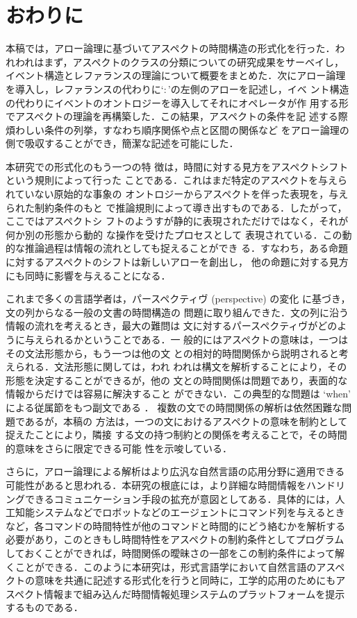 \section{おわりに}\label{sec:discus}
本稿では，アロー論理に基づいてアスペクトの時間構造の形式化を行った．わ
れわれはまず，アスペクトのクラスの分類についての研究成果をサーベイし，
イベント構造とレファランスの理論について概要をまとめた．次にアロー論理
を導入し，レファランスの代わりに`$\colon$'の左側のアローを記述し，イベ
ント構造の代わりにイベントのオントロジーを導入してそれにオペレータが作
用する形でアスペクトの理論を再構築した．この結果，アスペクトの条件を記
述する際煩わしい条件の列挙，すなわち順序関係や点と区間の関係など
をアロー論理の側で吸収することができ，簡潔な記述を可能にした．

本研究での形式化のもう一つの特
徴は，時間に対する見方をアスペクトシフトという規則によって行った
ことである．これはまだ特定のアスペクトを与えられていない原始的な事象の
オントロジーからアスペクトを伴った表現を，与えられた制約条件のもと
で推論規則によって導き出すものである．したがって，ここではアスペクトシ
フトのようすが静的に表現されただけではなく，それが何か別の形態から動的
な操作を受けたプロセスとして
表現されている．この動的な推論過程は情報の流れとしても捉えることができ
る．すなわち，ある命題に対するアスペクトのシフトは新しいアローを創出し，
他の命題に対する見方にも同時に影響を与えることになる．

これまで多くの言語学者は，パースペクティヴ (perspective) の変化 
\cite{Kamp93,Meulen95} に基づき，文の列からなる一般の文書の時間構造の
問題に取り組んできた．文の列に沿う情報の流れを考えるとき，最大の難問は
文に対するパースペクティヴがどのように与えられるかということである．一
般的にはアスペクトの意味は，一つはその文法形態から，もう一つは他の文
との相対的時間関係から説明されると考えられる．文法形態に関しては，われ
われは構文を解析することにより，その形態を決定することができるが，他の
文との時間関係は問題であり，表面的な情報からだけでは容易に解決すること
ができない．この典型的な問題は `when' による従属節をもつ副文である 
\cite{Moens88,Terenziani93}．
複数の文での時間関係の解析は依然困難な問題であるが，本稿の
方法は，一つの文におけるアスペクトの意味を制約として捉えたことにより，隣接
する文の持つ制約との関係を考えることで，その時間的意味をさらに限定できる可能
性を示唆している．

さらに，アロー論理による解析はより広汎な自然言語の応用分野に適用できる
可能性があると思われる．本研究の根底には，より詳細な時間情報をハンドリ
ングできるコミュニケーション手段の拡充が意図としてある．具体的には，人
工知能システムなどでロボットなどのエージェントにコマンド列を与えるとき
など，各コマンドの時間特性が他のコマンドと時間的にどう絡むかを解析する
必要があり，このときもし時間特性をアスペクトの制約条件としてプログラム
しておくことができれば，時間関係の曖昧さの一部をこの制約条件によって解
くことができる．このように本研究は，形式言語学において自然言語のアスペ
クトの意味を共通に記述する形式化を行うと同時に，工学的応用のためにもア
スペクト情報まで組み込んだ時間情報処理システムのプラットフォームを提示
するものである．


